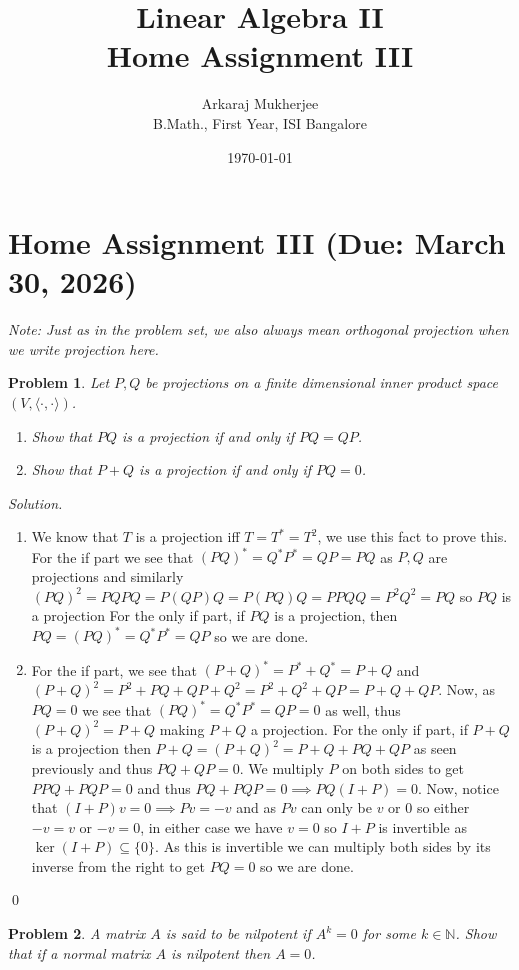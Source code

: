 \documentclass[12pt,a4paper]{article}
\title{\textbf{Linear Algebra II} \\ \large Home Assignment III}
\author{Arkaraj Mukherjee \\ B.Math., First Year, ISI Bangalore}
\date{\today}
\newenvironment{solution}{%
  \par\noindent\textit{Solution.}\ }{\qed}
\theoremstyle{problemstyle}
\newtheorem{problem}{Problem}[section]
\begin{document}
\maketitle
\newpage
\tableofcontents
\newpage
\section{Home Assignment III (Due: March 30, 2026)}
\textit{Note: Just as in the problem set, we also always mean orthogonal projection when we write projection here.}
\begin{problem}\label{prob:3-1}
Let $P, Q$ be projections on a finite dimensional inner product space $(V, \langle \cdot, \cdot \rangle)$.
\begin{enumerate}[label=(\roman*)]
    \item Show that $PQ$ is a projection if and only if $PQ = QP$.
    \item Show that $P + Q$ is a projection if and only if $PQ = 0$.
\end{enumerate}
\end{problem}
\begin{solution}
\begin{enumerate}[label=(\roman*)]
	\item We know that $T$ is a projection iff $T=T^*=T^2$, we use this fact to prove this. For the if part we see that $(PQ)^*=Q^*P^*=QP=PQ$ as $P,Q$ are projections and similarly $(PQ)^2=PQPQ=P(QP)Q=P(PQ)Q=PPQQ=P^2Q^2=PQ$ so $PQ$ is a projection For the only if part, if $PQ$ is a projection, then $PQ=(PQ)^*=Q^*P^*=QP$ so we are done. 
	\item For the if part, we see that $(P+Q)^*=P^*+Q^*=P+Q$ and $(P+Q)^2=P^2+PQ+QP+Q^2=P^2+Q^2+QP=P+Q+QP$. Now, as $PQ=0$ we see that $(PQ)^*=Q^*P^*=QP=0$ as well, thus $(P+Q)^2=P+Q$ making $P+Q$ a projection. For the only if part, if $P+Q$ is a projection then $P+Q=(P+Q)^2=P+Q+PQ+QP$ as seen previously and thus $PQ+QP=0$. We multiply $P$ on both sides to get $PPQ+PQP=0$ and thus $PQ+PQP=0\implies PQ(I+P)=0$. Now, notice that $(I+P)v=0\implies Pv=-v$ and as $Pv$ can only be $v$ or $0$ so either $-v=v$ or $-v=0$, in either case we have $v=0$ so $I+P$ is invertible as $\ker(I+P)\subseteq\{0\}$. As this is invertible we can multiply both sides by its inverse from the right to get $PQ=0$ so we are done.
\end{enumerate}
\end{solution}
\begin{problem}\label{prob:3-2}
A matrix $A$ is said to be \textit{nilpotent} if $A^k = 0$ for some $k \in \mathbb{N}$. Show that if a normal matrix $A$ is nilpotent then $A = 0$.
\end{problem}
\end{document}
